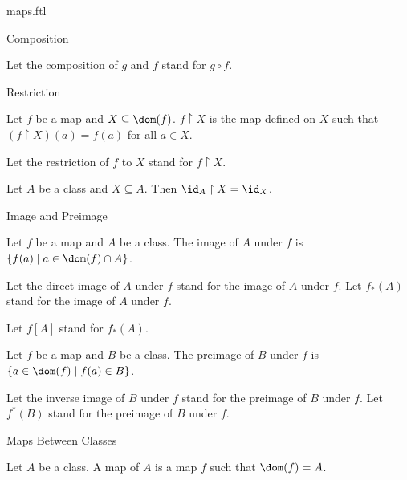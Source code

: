 \documentclass{naproche-library}
\begin{document}
\begin{smodule}[title=Maps]{maps.ftl}
\begin{sfragment}{Composition}
\begin{definition}[forthel,id=FOUNDATIONS_06_7605717729017856]
    Let the composition of $g$ and $f$ stand for $g \circ f$.
  \end{definition}
\end{sfragment}

\begin{sfragment}{Restriction}
  \begin{definition}[forthel,id=FOUNDATIONS_06_7095412741636096]
    Let $f$ be a map and $X \subseteq \dom(f)$.
    $f \restriction X$ is the map defined on $X$ such that $(f \restriction X)(a) = f(a)$ for all $a \in X$.

    Let the restriction of $f$ to $X$ stand for $f \restriction X$.
  \end{definition}

  \begin{proposition}[forthel,id=FOUNDATIONS_06_2170189258948608]
    Let $A$ be a class and $X \subseteq A$.
    Then $\id_{A} \restriction X = \id_{X}$.
  \end{proposition}
\end{sfragment}

\begin{sfragment}{Image and Preimage}
  \begin{definition}[forthel,id=FOUNDATIONS_06_3038237683613696]
    Let $f$ be a map and $A$ be a class.
    The image of $A$ under $f$ is $\{ f(a) \mid a \in \dom(f) \cap A \}$.

    Let the direct image of $A$ under $f$ stand for the image of $A$ under $f$.
    Let $f_{*}(A)$ stand for the image of $A$ under $f$.

    Let $f[A]$ stand for $f_{*}(A)$.
  \end{definition}

  \begin{definition}[forthel,id=FOUNDATIONS_06_4563167805964288]
    Let $f$ be a map and $B$ be a class.
    The preimage of $B$ under $f$ is $\{ a \in \dom(f) \mid f(a) \in B \}$.

    Let the inverse image of $B$ under $f$ stand for the preimage of $B$ under $f$.
    Let $f^{*}(B)$ stand for the preimage of $B$ under $f$.
  \end{definition}
\end{sfragment}

\begin{sfragment}{Maps Between Classes}
  \begin{definition}[forthel,id=FOUNDATIONS_06_6934038600220672]
    Let $A$ be a class.
    A map of $A$ is a map $f$ such that $\dom(f) = A$.


\end{definition}
\end{sfragment}
\end{smodule}
\end{document}
